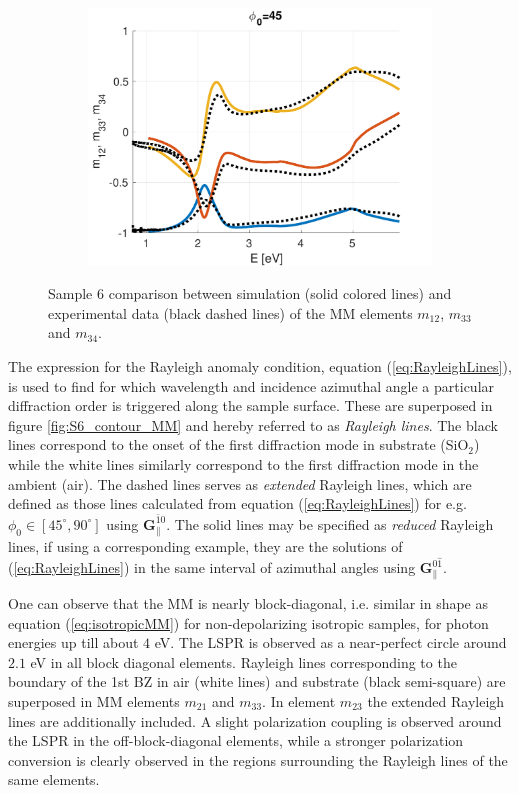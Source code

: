 \begin{figure}[h]
   \begin{subfigure}{\linewidth}
        \centering
        \includegraphics[width=0.49\linewidth, trim= 0cm 0cm 2cm 0cm, clip]{figures/ch4/S6/NCS/S6_NCS_phi45.pdf}
   \end{subfigure}
   \caption{Sample 6 comparison between simulation (solid colored lines) and experimental data (black dashed lines) of the MM elements $m_{12}$, $m_{33}$ and $m_{34}$.}
   \label{fig:S6_NCS}
\end{figure}

The expression for the Rayleigh anomaly condition, equation (\ref{eq:RayleighLines}), is used to find for which wavelength and incidence azimuthal angle a particular diffraction order is triggered along the sample surface. These are superposed in figure \ref{fig:S6_contour_MM} and hereby referred to as \emph{Rayleigh lines}. The black lines correspond to the onset of the first diffraction mode in substrate (SiO$_2$) while the white lines similarly correspond to the first diffraction mode in the ambient (air). The dashed lines serves as \emph{extended} Rayleigh lines, which are defined as those lines calculated from equation (\ref{eq:RayleighLines}) for e.g. $\phi_0\in[45^\circ, 90^\circ]$ using $\mathbf{G}_\parallel^{\bar{1}0}$. The solid lines may be specified as \emph{reduced} Rayleigh lines, if using a corresponding example, they are the solutions of (\ref{eq:RayleighLines}) in the same interval of azimuthal angles using $\mathbf{G}_\parallel^{0\hat{1}}$.

One can observe that the MM is nearly block-diagonal, i.e. similar in shape as equation (\ref{eq:isotropicMM}) for non-depolarizing isotropic samples, for photon energies up till about $4$ eV. The LSPR is observed as a near-perfect circle around $2.1$ eV in all block diagonal elements. Rayleigh lines corresponding to the boundary of the 1st BZ in air (white lines) and substrate (black semi-square) are superposed in MM elements $m_{21}$ and $m_{33}$. In element $m_{23}$ the extended Rayleigh lines are additionally included. A slight polarization coupling is observed around the LSPR in the off-block-diagonal elements, while a stronger polarization conversion is clearly observed in the regions surrounding the Rayleigh lines of the same elements. 

